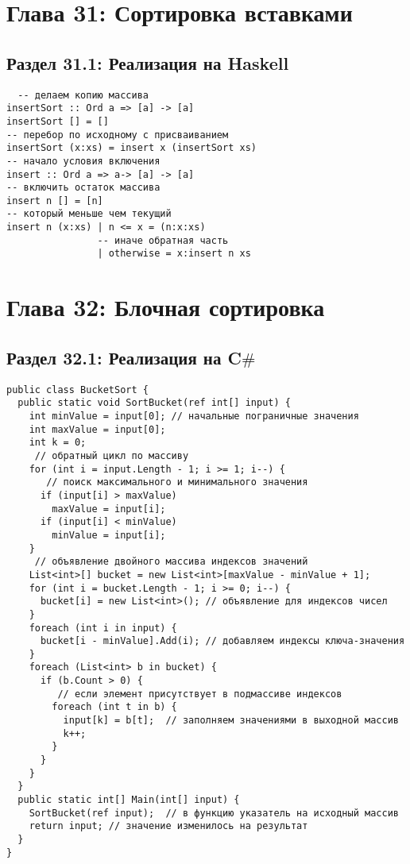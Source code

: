 \chapter*{Глава 31: Сортировка вставками } 
\section*{Раздел 31.1: Реализация на Haskell}
\begin{tcolorbox}
\begin{verbatim}
  -- делаем копию массива
insertSort :: Ord a => [a] -> [a]
insertSort [] = []
-- перебор по исходному с присваиванием
insertSort (x:xs) = insert x (insertSort xs)
-- начало условия включения
insert :: Ord a => a-> [a] -> [a]
-- включить остаток массива
insert n [] = [n]
-- который меньше чем текущий
insert n (x:xs) | n <= x = (n:x:xs)
                -- иначе обратная часть
                | otherwise = x:insert n xs
\end{verbatim}
\end{tcolorbox}


\newpage
\chapter*{Глава 32: Блочная сортировка} 
\section*{Раздел 32.1: Реализация на C$\#$}
\begin{tcolorbox}
\begin{verbatim}
public class BucketSort {
  public static void SortBucket(ref int[] input) {
    int minValue = input[0]; // начальные пограничные значения
    int maxValue = input[0];
    int k = 0;
     // обратный цикл по массиву
    for (int i = input.Length - 1; i >= 1; i--) {
       // поиск максимального и минимального значения
      if (input[i] > maxValue) 
        maxValue = input[i];
      if (input[i] < minValue) 
        minValue = input[i];
    }
     // объявление двойного массива индексов значений
    List<int>[] bucket = new List<int>[maxValue - minValue + 1];
    for (int i = bucket.Length - 1; i >= 0; i--) {
      bucket[i] = new List<int>(); // объявление для индексов чисел
    }
    foreach (int i in input) {
      bucket[i - minValue].Add(i); // добавляем индексы ключа-значения
    }
    foreach (List<int> b in bucket) {
      if (b.Count > 0) {
         // если элемент присутствует в подмассиве индексов
        foreach (int t in b) {
          input[k] = b[t];  // заполняем значениями в выходной массив
          k++;
        }
      }
    }
  }
  public static int[] Main(int[] input) {
    SortBucket(ref input);  // в функцию указатель на исходный массив
    return input; // значение изменилось на результат
  }
}
\end{verbatim}
\end{tcolorbox}

